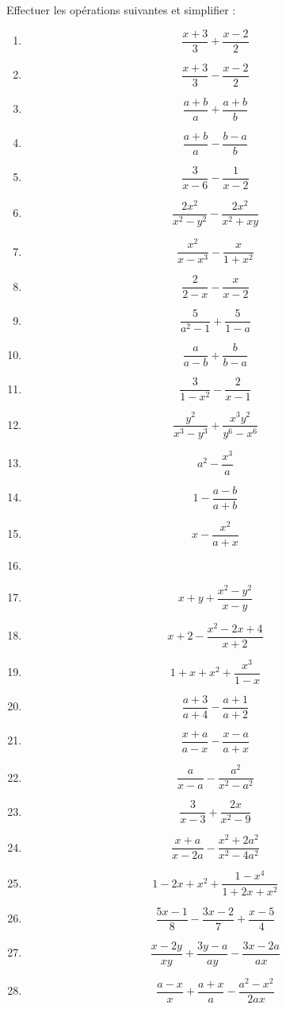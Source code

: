 \begin{exercice}
Effectuer les opérations suivantes et simplifier :
\begin{multicols}{2}
\begin{enumerate}
\item $$\frac{x+3}{3}+\frac{x-2}{2}$$
\item $$\frac{x+3}{3}-\frac{x-2}{2}$$
\item $$\frac{a+b}{a}+\frac{a+b}{b}$$
\item $$\frac{a+b}{a}-\frac{b-a}{b}$$
\item $$\frac{3}{x-6}-\frac{1}{x-2}$$
\item $$\frac{2{{x}^{2}}}{{{x}^{2}}-{{y}^{2}}}-\frac{2{{x}^{2}}}{{{x}^{2}}+xy}$$
\item $$\frac{{{x}^{2}}}{x-{{x}^{3}}}-\frac{x}{1+{{x}^{2}}}$$
\item $$\frac{2}{2-x}-\frac{x}{x-2}$$
\item $$\frac{5}{{{a}^{2}}-1}+\frac{5}{1-a}$$
\item $$\frac{a}{a-b}+\frac{b}{b-a}$$
\item $$\frac{3}{1-{{x}^{2}}}-\frac{2}{x-1}$$
\item $$\frac{{{y}^{2}}}{{{x}^{3}}-{{y}^{3}}}+\frac{{{x}^{3}}{{y}^{2}}}{{{y}^{6}}-{{x}^{6}}}$$
\item $${{a}^{2}}-\frac{{{x}^{3}}}{a}$$
\item $$1-\frac{a-b}{a+b}$$
\item $$x-\frac{{{x}^{2}}}{a+x}$$
\item \item $$x+y+\frac{{{x}^{2}}-{{y}^{2}}}{x-y}$$
\item $$x+2-\frac{{{x}^{2}}-2x+4}{x+2}$$
\item $$1+x+{{x}^{2}}+\frac{{{x}^{3}}}{1-x}$$
\item $$\frac{a+3}{a+4}-\frac{a+1}{a+2}$$
\item $$\frac{x+a}{a-x}-\frac{x-a}{a+x}$$
\item $$\frac{a}{x-a}-\frac{{{a}^{2}}}{{{x}^{2}}-{{a}^{2}}}$$
\item $$\frac{3}{x-3}+\frac{2x}{{{x}^{2}}-9}$$
\item $$\frac{x+a}{x-2a}-\frac{{{x}^{2}}+2{{a}^{2}}}{{{x}^{2}}-4{{a}^{2}}}$$
\item $$1-2x+{{x}^{2}}+\frac{1-{{x}^{4}}}{1+2x+{{x}^{2}}}$$
\item $$\frac{5x-1}{8}-\frac{3x-2}{7}+\frac{x-5}{4}$$
\item $$\frac{x-2y}{xy}+\frac{3y-a}{ay}-\frac{3x-2a}{ax}$$
\item $$\frac{a-x}{x}+\frac{a+x}{a}-\frac{{{a}^{2}}-{{x}^{2}}}{2ax}$$

\end{enumerate}
\end{multicols}
\end{exercice}
